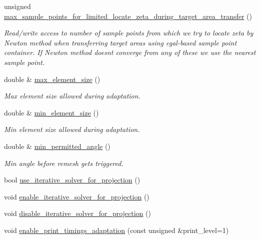 \begin{DoxyCompactItemize}
unsigned \hyperlink{classoomph_1_1RefineableTriangleMesh_a6ba54a6ea103236a3e5c31c2e8a11af9}{max\+\_\+sample\+\_\+points\+\_\+for\+\_\+limited\+\_\+locate\+\_\+zeta\+\_\+during\+\_\+target\+\_\+area\+\_\+transfer} ()
\begin{DoxyCompactList}\small\item\em Read/write access to number of sample points from which we try to locate zeta by Newton method when transferring target areas using cgal-\/based sample point container. If Newton method doesn\textquotesingle{}t converge from any of these we use the nearest sample point. \end{DoxyCompactList}\item 
double \& \hyperlink{classoomph_1_1RefineableTriangleMesh_a60fabb7d4e9389f827d6cfd332237c15}{max\+\_\+element\+\_\+size} ()
\begin{DoxyCompactList}\small\item\em Max element size allowed during adaptation. \end{DoxyCompactList}\item 
double \& \hyperlink{classoomph_1_1RefineableTriangleMesh_ad25cf23f688c1007b5fbbe41d2ec6cfc}{min\+\_\+element\+\_\+size} ()
\begin{DoxyCompactList}\small\item\em Min element size allowed during adaptation. \end{DoxyCompactList}\item 
double \& \hyperlink{classoomph_1_1RefineableTriangleMesh_a85f0515f33a727c75b80bfbbfe4b53f9}{min\+\_\+permitted\+\_\+angle} ()
\begin{DoxyCompactList}\small\item\em Min angle before remesh gets triggered. \end{DoxyCompactList}\item 
bool \hyperlink{classoomph_1_1RefineableTriangleMesh_ae2f0885e6e3fc4c0566986d9c8d2fe65}{use\+\_\+iterative\+\_\+solver\+\_\+for\+\_\+projection} ()
\item 
void \hyperlink{classoomph_1_1RefineableTriangleMesh_aa0e6f48ae67efc2931c03ca22eaa9ca0}{enable\+\_\+iterative\+\_\+solver\+\_\+for\+\_\+projection} ()
\item 
void \hyperlink{classoomph_1_1RefineableTriangleMesh_a081ddf29176d5599c6af173f73dd4a8d}{disable\+\_\+iterative\+\_\+solver\+\_\+for\+\_\+projection} ()
\item 
void \hyperlink{classoomph_1_1RefineableTriangleMesh_a53f7ac7fbe9fdde0fb52b634d7370221}{enable\+\_\+print\+\_\+timings\+\_\+adaptation} (const unsigned \&print\+\_\+level=1)

\end{DoxyCompactItemize}

